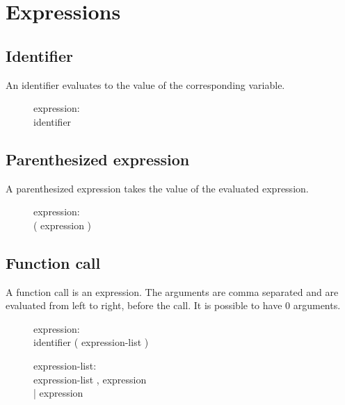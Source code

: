 \section{Expressions}
\subsection{Identifier}
An identifier evaluates to the value of the corresponding variable.
\begin{description}
  \item[]expression: \hfill \\
    identifier
\end{description}

\subsection{Parenthesized expression}
A parenthesized expression takes the value of the evaluated expression.
\begin{description}
  \item[]expression: \hfill \\
    ( expression )
\end{description}

\subsection{Function call}
A function call is an expression. The arguments are comma separated and are evaluated
from left to right, before the call. It is possible to have 0 arguments.
\begin{description}
  \item[]expression: \hfill \\
    identifier ( expression-list )
\end{description}

\begin{description}
  \item[]expression-list: \hfill \\
    expression-list , expression \\
    | expression
\end{description}


